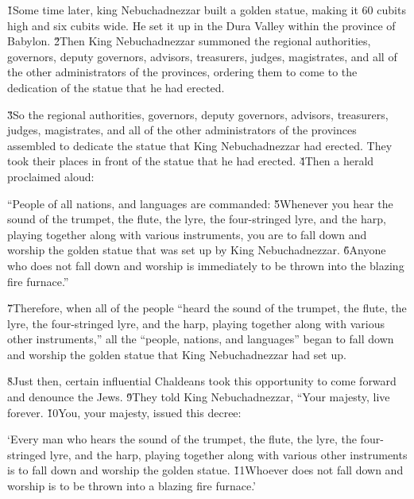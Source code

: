 \v{1}Some time later, king Nebuchadnezzar built a golden statue, making it 60 cubits high and six cubits wide. He set it up in the Dura Valley within the province of Babylon. \v{2}Then King Nebuchadnezzar summoned the regional authorities, governors, deputy governors, advisors, treasurers, judges, magistrates, and all of the other administrators of the provinces, ordering them to come to the dedication of the statue that he had erected.

\v{3}So the regional authorities, governors, deputy governors, advisors, treasurers, judges, magistrates, and all of the other administrators of the provinces assembled to dedicate the statue that King Nebuchadnezzar had erected. They took their places in front of the statue that he had erected. \v{4}Then a herald proclaimed aloud:

\begin{poetry}
\poeml ``People of all nations, and languages are commanded: \v{5}Whenever you hear the sound of the trumpet, the flute, the lyre, the four-stringed lyre, and the harp, playing together along with various instruments, you are to fall down and worship the golden statue that was set up by King Nebuchadnezzar. \v{6}Anyone who does not fall down and worship is immediately to be thrown into the blazing fire furnace.''
\end{poetry}

\v{7}Therefore, when all of the people ``heard the sound of the trumpet, the flute, the lyre, the four-stringed lyre, and the harp, playing together along with various other instruments,'' all the ``people, nations, and languages'' began to fall down and worship the golden statue that King Nebuchadnezzar had set up.

\v{8}Just then, certain influential Chaldeans took this opportunity to come forward and denounce the Jews. \v{9}They told King Nebuchadnezzar, ``Your majesty, live forever. \v{10}You, your majesty, issued this decree:

\begin{poetry}
\poeml `Every man who hears the sound of the trumpet, the flute, the lyre, the four-stringed lyre, and the harp, playing together along with various other instruments is to fall down and worship the golden statue. \v{11}Whoever does not fall down and worship is to be thrown into a blazing fire furnace.'
\end{poetry}

